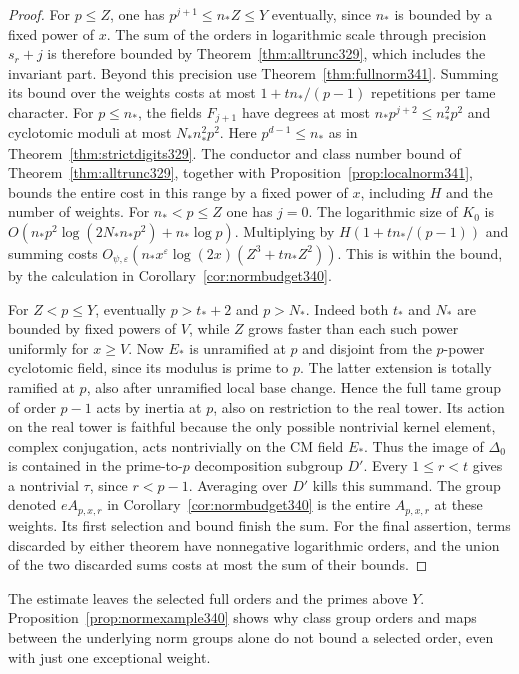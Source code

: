 \documentclass[a4paper,11pt]{article}
\theoremstyle{definition}
\theoremstyle{remark}
\numberwithin{equation}{section}
\begin{document}
\begin{proof}
For $p\le Z$, one has $p^{j+1}\le n_*Z\le Y$ eventually, since
$n_*$ is bounded by a fixed power of $x$. The sum of the orders
in logarithmic scale through precision $s_r+j$ is therefore bounded
by Theorem~\ref{thm:alltrunc329}, which includes the invariant part.
Beyond this precision use Theorem~\ref{thm:fullnorm341}. Summing its
bound over the weights costs at most $1+tn_* /(p-1)$ repetitions per
tame character. For $p\le n_*$, the fields $F_{j+1}$ have degrees
at most $n_*p^{j+2}\le n_*^2p^2$ and cyclotomic moduli at most
$N_*n_*^2p^2$. Here $p^{d-1}\le n_*$ as in
Theorem~\ref{thm:strictdigits329}. The conductor and class number
bound of Theorem~\ref{thm:alltrunc329}, together with
Proposition~\ref{prop:localnorm341}, bounds the entire cost in
this range by a fixed power of $x$, including $H$ and the number
of weights. For $n_*<p\le Z$ one has $j=0$. The logarithmic size
of $K_0$ is $O(n_*p^2\log(2N_*n_*p^2)+n_*\log p)$. Multiplying
by $H(1+tn_* /(p-1))$ and summing costs
$O_{\psi,\varepsilon}(n_* x^\varepsilon\log(2x)(Z^3+tn_*Z^2))$.
This is within the bound, by the calculation in
Corollary~\ref{cor:normbudget340}.

For $Z<p\le Y$, eventually $p>t_*+2$ and $p>N_*$. Indeed both
$t_*$ and $N_*$ are bounded by fixed powers of $V$, while $Z$
grows faster than each such power uniformly for $x\ge V$. Now
$E_*$ is unramified at $p$ and disjoint from the $p$-power
cyclotomic field, since its modulus is prime to $p$. The latter
extension is totally ramified at $p$, also after unramified local
base change. Hence the full tame group of order $p-1$ acts by
inertia at $p$, also on restriction to the real tower. Its action
on the real tower is faithful because the only possible nontrivial kernel element,
complex conjugation, acts nontrivially on the CM field $E_*$. Thus the image
of $\Delta_0$ is contained in the prime-to-$p$ decomposition
subgroup $D'$. Every $1\le r<t$ gives a nontrivial $\tau$, since
$r<p-1$. Averaging over $D'$ kills this summand. The group denoted
$eA_{p,x,r}$ in Corollary~\ref{cor:normbudget340} is the entire
$A_{p,x,r}$ at these weights. Its first selection and bound finish
the sum. For the final assertion, terms discarded by either theorem
have nonnegative logarithmic orders, and the union of the two
discarded sums costs at most the sum of their bounds.
\end{proof}

The estimate leaves the selected full orders and the primes above
$Y$. Proposition~\ref{prop:normexample340} shows why class group
orders and maps between the underlying norm groups alone do not
bound a selected order, even with just one exceptional weight.
\end{document}
